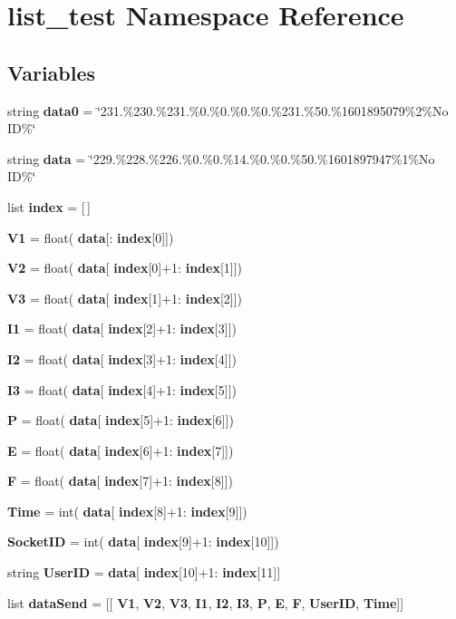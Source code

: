 \section{list\+\_\+test Namespace Reference}
\label{namespacelist__test}
\subsection*{Variables}
\begin{DoxyCompactItemize}
\item 
string \textbf{ data0} = \char`\"{}231.\%230.\%231.\%0.\%0.\%0.\%0.\%231.\%50.\%1601895079\%2\%No ID\%\char`\"{}
\item 
string \textbf{ data} = \char`\"{}229.\%228.\%226.\%0.\%0.\%14.\%0.\%0.\%50.\%1601897947\%1\%No ID\%\char`\"{}
\item 
list \textbf{ index} = [$\,$]
\item 
\textbf{ V1} = float(\textbf{ data}[\+:\textbf{ index}[0]])
\item 
\textbf{ V2} = float(\textbf{ data}[\textbf{ index}[0]+1\+:\textbf{ index}[1]])
\item 
\textbf{ V3} = float(\textbf{ data}[\textbf{ index}[1]+1\+:\textbf{ index}[2]])
\item 
\textbf{ I1} = float(\textbf{ data}[\textbf{ index}[2]+1\+:\textbf{ index}[3]])
\item 
\textbf{ I2} = float(\textbf{ data}[\textbf{ index}[3]+1\+:\textbf{ index}[4]])
\item 
\textbf{ I3} = float(\textbf{ data}[\textbf{ index}[4]+1\+:\textbf{ index}[5]])
\item 
\textbf{ P} = float(\textbf{ data}[\textbf{ index}[5]+1\+:\textbf{ index}[6]])
\item 
\textbf{ E} = float(\textbf{ data}[\textbf{ index}[6]+1\+:\textbf{ index}[7]])
\item 
\textbf{ F} = float(\textbf{ data}[\textbf{ index}[7]+1\+:\textbf{ index}[8]])
\item 
\textbf{ Time} = int(\textbf{ data}[\textbf{ index}[8]+1\+:\textbf{ index}[9]])
\item 
\textbf{ Socket\+ID} = int(\textbf{ data}[\textbf{ index}[9]+1\+:\textbf{ index}[10]])
\item 
string \textbf{ User\+ID} = \textbf{ data}[\textbf{ index}[10]+1\+:\textbf{ index}[11]]
\item 
list \textbf{ data\+Send} = [[\textbf{ V1}, \textbf{ V2}, \textbf{ V3}, \textbf{ I1}, \textbf{ I2}, \textbf{ I3}, \textbf{ P}, \textbf{ E}, \textbf{ F}, \textbf{ User\+ID}, \textbf{ Time}]]
\end{DoxyCompactItemize}


